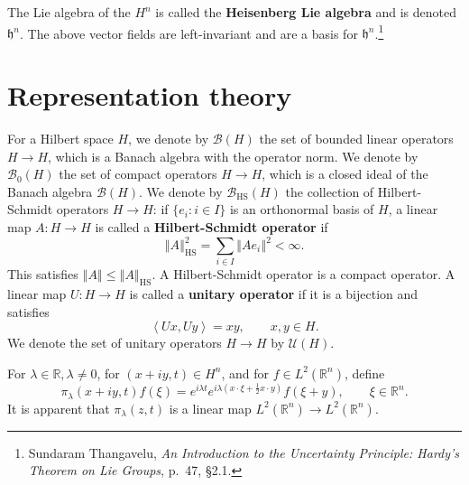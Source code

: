 \documentclass{article}
\newcommand{\inner}[2]{\left\langle #1, #2 \right\rangle}
\newcommand{\norm}[1]{\left\Vert #1 \right\Vert}
\newcommand{\HS}[1]{\left\Vert #1 \right\Vert_{\mathrm{HS}}}
\theoremstyle{definition}
\theoremstyle{definition}
\begin{document}
The Lie algebra of the $H^n$ is called the \textbf{Heisenberg Lie algebra} and is denoted $\mathfrak{h}^n$.
The above vector fields are left-invariant and are a basis for $\mathfrak{h}^n$.\footnote{Sundaram Thangavelu,
{\em An Introduction to the Uncertainty Principle: Hardy's Theorem on Lie Groups}, p.~47, \S 2.1.}


\section{Representation theory}
For a Hilbert space $H$, we denote by $\mathscr{B}(H)$ the set of 
bounded linear operators $H \to H$, which  is a Banach algebra with the operator norm. We denote by $\mathscr{B}_0(H)$ the set
of
compact operators $H \to H$, which is a closed ideal of the Banach algebra $\mathscr{B}(H)$. 
We denote by $\mathscr{B}_{\mathrm{HS}}(H)$ the collection of Hilbert-Schmidt operators $H \to H$: if $\{e_i: i \in I\}$ is an orthonormal basis
of $H$, a linear map $A:H \to H$ is called a  \textbf{Hilbert-Schmidt operator} if
\[
\HS{A}^2 = \sum_{i \in I} \norm{Ae_i}^2 < \infty.
\]
This satisfies $\norm{A} \leq \HS{A}$.
A Hilbert-Schmidt operator is a compact operator.
A linear map $U:H \to H$ is called a \textbf{unitary operator} if it is a bijection and satisfies
\[
\inner{Ux}{Uy} = {x}{y},\qquad x,y \in H.
\]
We denote the
set of unitary operators $H \to H$ by $\mathscr{U}(H)$. 




For $\lambda \in \mathbb{R}, \lambda \neq 0$, for $(x+iy,t) \in H^n$, and for $f \in L^2(\mathbb{R}^n)$, define
\[
\pi_\lambda(x+iy,t)f(\xi) = e^{i\lambda t} e^{i\lambda\left(x\cdot \xi+\frac{1}{2}x\cdot y\right)} f(\xi+y),
\qquad \xi \in \mathbb{R}^n.
\]
It is apparent that $\pi_\lambda(z,t)$ is a linear map $L^2(\mathbb{R}^n) \to L^2(\mathbb{R}^n)$. 
\end{document}
